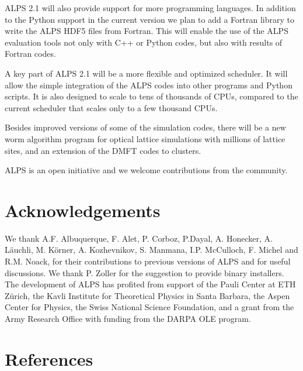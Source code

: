 \documentclass[12pt]{iopart}
\begin{document}
ALPS 2.1 will also provide support for more programming languages. In addition to the Python support in the current version we plan to add a Fortran library to write the ALPS HDF5 files from Fortran. This will enable the use of the ALPS evaluation tools not only with C++ or Python codes, but also with results of Fortran codes.

A key part of ALPS 2.1 will be a more flexible and optimized scheduler. It will allow  the simple integration of the ALPS codes into other programs and Python scripts. It is also designed to scale to tens of thousands of CPUs, compared to the current scheduler that scales only to a few thousand CPUs. 

Besides improved versions of some of the simulation codes, there will be a new worm algorithm program for optical lattice simulations with millions of lattice sites, and an extension of the DMFT codes to clusters.

ALPS is an open initiative and we welcome contributions from the community.


\section{Acknowledgements}

We thank A.F. Albuquerque, F. Alet, P. Corboz, P.Dayal, A. Honecker, A. L\"auchli, M. K\"orner,  A. Kozhevnikov, S. Manmana, I.P. McCulloch, F. Michel and R.M. Noack, for their contributions to previous versions of ALPS and  for useful discussions. We thank P. Zoller for the suggestion to provide binary installers. The development of ALPS has profited from support of the Pauli Center at ETH Z\"urich, the Kavli Institute for Theoretical Physics in Santa Barbara, the Aspen Center for Physics, the Swiss National Science Foundation, and a grant from the Army Research Office with funding from the DARPA OLE program.


\section*{References}


\end{document}

